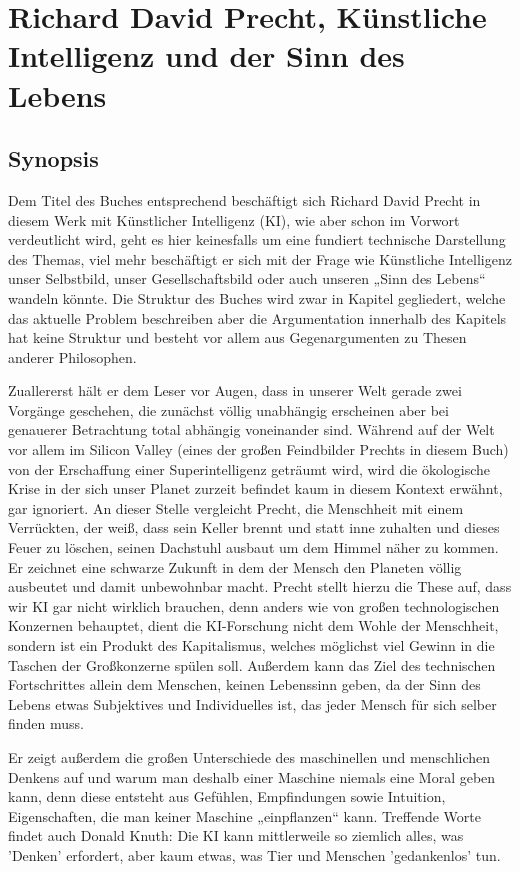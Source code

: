 \documentclass[twoside, a4paper, DIV=11, open=any, bibliography=totoc]{scrbook}
\newcommand{\Quote}[1]{\glqq #1\grqq{}}
\begin{document}
\section{Richard David Precht, Künstliche Intelligenz und der Sinn des Lebens} \label{sec:litb3}
\subsection{Synopsis} \label{sec:litsynops3}

Dem Titel des Buches entsprechend beschäftigt sich Richard David Precht in diesem Werk mit Künstlicher Intelligenz (KI), wie aber schon im Vorwort verdeutlicht wird, geht es hier keinesfalls um eine fundiert technische Darstellung des Themas, viel mehr beschäftigt er sich mit der Frage wie Künstliche Intelligenz unser Selbstbild, unser Gesellschaftsbild oder auch unseren „Sinn des Lebens“ wandeln könnte. Die Struktur des Buches wird zwar in Kapitel gegliedert, welche das aktuelle Problem beschreiben aber die Argumentation innerhalb des Kapitels hat keine Struktur und besteht vor allem aus Gegenargumenten zu Thesen anderer Philosophen. \par 
Zuallererst hält er dem Leser vor Augen, dass in unserer Welt gerade zwei Vorgänge geschehen, die zunächst völlig unabhängig erscheinen aber bei genauerer Betrachtung total abhängig voneinander sind. Während auf der Welt vor allem im Silicon Valley (eines der großen Feindbilder Prechts in diesem Buch) von der Erschaffung einer Superintelligenz geträumt wird, wird die ökologische Krise in der sich unser Planet zurzeit befindet kaum in diesem Kontext erwähnt, gar ignoriert. An dieser Stelle vergleicht Precht, die Menschheit mit einem Verrückten, der weiß, dass sein Keller brennt und statt inne zuhalten und dieses Feuer zu löschen, seinen Dachstuhl ausbaut um dem Himmel näher zu kommen. Er zeichnet eine schwarze Zukunft in dem der Mensch den Planeten völlig ausbeutet und damit unbewohnbar macht. Precht stellt hierzu die These auf, dass wir KI gar nicht wirklich brauchen, denn anders wie von großen technologischen Konzernen behauptet, dient die KI-Forschung nicht dem Wohle der Menschheit, sondern ist ein Produkt des Kapitalismus, welches möglichst viel Gewinn in die Taschen der Großkonzerne spülen soll. Außerdem kann das Ziel des technischen Fortschrittes allein dem Menschen, keinen Lebenssinn geben, da der Sinn des Lebens etwas Subjektives und Individuelles ist, das jeder Mensch für sich selber finden muss. \par
Er zeigt außerdem die großen Unterschiede des maschinellen und menschlichen Denkens auf und warum man deshalb einer Maschine niemals eine Moral geben kann, denn diese entsteht aus Gefühlen, Empfindungen sowie Intuition, Eigenschaften, die man keiner Maschine „einpflanzen“ kann. Treffende Worte findet auch Donald Knuth: \Quote{Die KI kann mittlerweile so ziemlich alles, was 'Denken' erfordert, aber kaum etwas, was Tier und Menschen 'gedankenlos' tun}. \par
\end{document}
